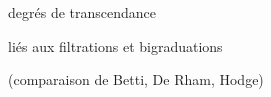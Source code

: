 degrés de transcendance

liés aux filtrations et bigraduations

(comparaison de Betti, De Rham, Hodge)
